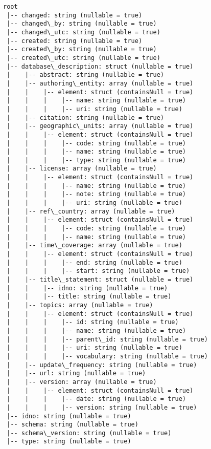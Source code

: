 \documentclass[11pt]{article}
\begin{document}
    
    \begin{Verbatim}[commandchars=\\\{\}]
root
 |-- changed: string (nullable = true)
 |-- changed\_by: string (nullable = true)
 |-- changed\_utc: string (nullable = true)
 |-- created: string (nullable = true)
 |-- created\_by: string (nullable = true)
 |-- created\_utc: string (nullable = true)
 |-- database\_description: struct (nullable = true)
 |    |-- abstract: string (nullable = true)
 |    |-- authoring\_entity: array (nullable = true)
 |    |    |-- element: struct (containsNull = true)
 |    |    |    |-- name: string (nullable = true)
 |    |    |    |-- uri: string (nullable = true)
 |    |-- citation: string (nullable = true)
 |    |-- geographic\_units: array (nullable = true)
 |    |    |-- element: struct (containsNull = true)
 |    |    |    |-- code: string (nullable = true)
 |    |    |    |-- name: string (nullable = true)
 |    |    |    |-- type: string (nullable = true)
 |    |-- license: array (nullable = true)
 |    |    |-- element: struct (containsNull = true)
 |    |    |    |-- name: string (nullable = true)
 |    |    |    |-- note: string (nullable = true)
 |    |    |    |-- uri: string (nullable = true)
 |    |-- ref\_country: array (nullable = true)
 |    |    |-- element: struct (containsNull = true)
 |    |    |    |-- code: string (nullable = true)
 |    |    |    |-- name: string (nullable = true)
 |    |-- time\_coverage: array (nullable = true)
 |    |    |-- element: struct (containsNull = true)
 |    |    |    |-- end: string (nullable = true)
 |    |    |    |-- start: string (nullable = true)
 |    |-- title\_statement: struct (nullable = true)
 |    |    |-- idno: string (nullable = true)
 |    |    |-- title: string (nullable = true)
 |    |-- topics: array (nullable = true)
 |    |    |-- element: struct (containsNull = true)
 |    |    |    |-- id: string (nullable = true)
 |    |    |    |-- name: string (nullable = true)
 |    |    |    |-- parent\_id: string (nullable = true)
 |    |    |    |-- uri: string (nullable = true)
 |    |    |    |-- vocabulary: string (nullable = true)
 |    |-- update\_frequency: string (nullable = true)
 |    |-- url: string (nullable = true)
 |    |-- version: array (nullable = true)
 |    |    |-- element: struct (containsNull = true)
 |    |    |    |-- date: string (nullable = true)
 |    |    |    |-- version: string (nullable = true)
 |-- idno: string (nullable = true)
 |-- schema: string (nullable = true)
 |-- schema\_version: string (nullable = true)
 |-- type: string (nullable = true)

    \end{Verbatim}
\end{document}
